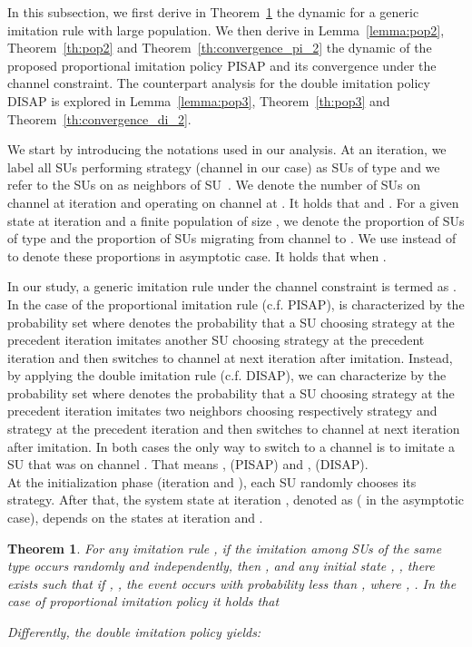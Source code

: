 \documentclass[12pt, onecolumn]{IEEEtran}
\theoremstyle{plain}
\newtheorem{theorem}{Theorem}
\theoremstyle{definition}
\begin{document}
In this subsection, we first derive in Theorem~\ref{th:finitePop} the dynamic for a generic imitation rule  with large population. We then derive in Lemma~\ref{lemma:pop2}, Theorem~\ref{th:pop2} and Theorem~\ref{th:convergence_pi_2} the dynamic of the proposed proportional imitation policy PISAP and its convergence under the channel constraint. The counterpart analysis for the double imitation policy DISAP is explored in Lemma~\ref{lemma:pop3}, Theorem~\ref{th:pop3} and Theorem~\ref{th:convergence_di_2}.







We start by introducing the notations used in our analysis. At an iteration, we label all SUs performing strategy  (channel  in our case) as SUs of type  and we refer to the SUs on  as neighbors of SU~. We denote  the number of SUs on channel  at iteration  and operating on channel  at . It holds that  and . For a given state  at iteration  and a finite population of size , we denote
 the proportion of SUs of type  and  the proportion of SUs migrating from channel  to . We use  instead of  to denote these proportions in asymptotic case. It holds that  when .




In our study, a generic imitation rule under the channel constraint is termed as . In the case of the proportional imitation rule (c.f. PISAP),  is characterized by the probability set
 where  denotes the probability that a SU choosing strategy  at the precedent iteration imitates another SU choosing strategy  at the precedent iteration and
then switches to channel  at next iteration after imitation. Instead, by applying the double imitation rule (c.f. DISAP), we can characterize  by the probability set 
where  denotes the probability that a SU choosing strategy  at the precedent iteration imitates two neighbors choosing respectively strategy  and strategy  at the
precedent iteration and then switches to channel 
at next iteration after imitation. In both cases the only way to switch to a channel  is to imitate a SU that was on channel . That means ,  (PISAP)
and ,  (DISAP). \\
At the initialization phase (iteration  and ), each SU randomly chooses its strategy. After that, the system state at iteration , denoted
as  ( in the asymptotic case), depends on the states at iteration  and .



\begin{theorem}
For any imitation rule , if the imitation among SUs of the same type occurs randomly and independently, then ,  and any initial state , , there exists 
such that if , , the event  occurs with probability less than , where
, . In the case of proportional imitation policy it holds that

Differently, the double imitation policy yields:


\label{th:finitePop}
\end{theorem}
\end{document}
